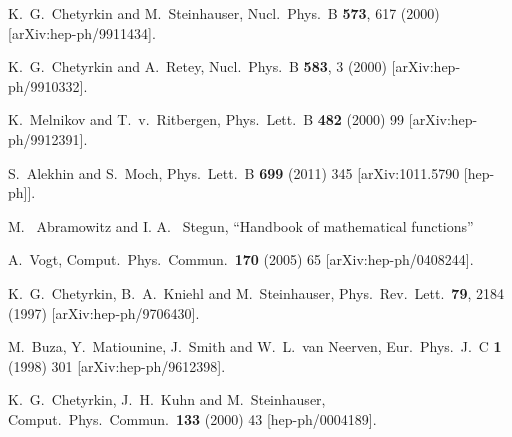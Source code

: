 \documentclass[10pt,a4paper]{article}
\begin{document}
\newpage

\begin{thebibliography}{alp}

  K.~G.~Chetyrkin and M.~Steinhauser,
  Nucl.\ Phys.\  B {\bf 573}, 617 (2000)
  [arXiv:hep-ph/9911434].

  K.~G.~Chetyrkin and A.~Retey,
  Nucl.\ Phys.\  B {\bf 583}, 3 (2000)
  [arXiv:hep-ph/9910332].

  K.~Melnikov and T.~v.~Ritbergen,
  Phys.\ Lett.\  B {\bf 482} (2000) 99
  [arXiv:hep-ph/9912391].

  S.~Alekhin and S.~Moch,
  Phys.\ Lett.\  B {\bf 699} (2011) 345
  [arXiv:1011.5790 [hep-ph]].

  M.~ Abramowitz and I. A.~ Stegun,
  ``Handbook of mathematical functions''

  A.~Vogt,
  Comput.\ Phys.\ Commun.\  {\bf 170} (2005) 65
  [arXiv:hep-ph/0408244].

  K.~G.~Chetyrkin, B.~A.~Kniehl and M.~Steinhauser,
  Phys.\ Rev.\ Lett.\  {\bf 79}, 2184 (1997)
  [arXiv:hep-ph/9706430].

  M.~Buza, Y.~Matiounine, J.~Smith and W.~L.~van Neerven,
  Eur.\ Phys.\ J.\  C {\bf 1} (1998) 301
  [arXiv:hep-ph/9612398].
  
  K.~G.~Chetyrkin, J.~H.~Kuhn and M.~Steinhauser,
  Comput.\ Phys.\ Commun.\  {\bf 133} (2000) 43
  [hep-ph/0004189].

\end{thebibliography}
\end{document}
